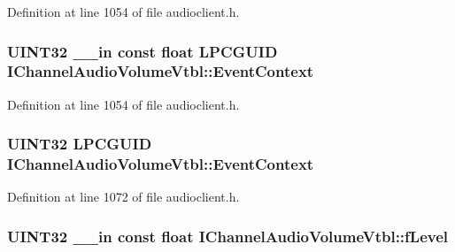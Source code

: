 Definition at line 1054 of file audioclient.\+h.

\subsubsection[{\texorpdfstring{Event\+Context}{EventContext}}]{ U\+I\+N\+T32 {\bf \+\_\+\+\_\+in} {\bf const} float {\bf L\+P\+C\+G\+U\+ID} I\+Channel\+Audio\+Volume\+Vtbl\+::\+Event\+Context}\hypertarget{struct_i_channel_audio_volume_vtbl_a0647d9cc251cffc408440c82883078fe}{}\label{struct_i_channel_audio_volume_vtbl_a0647d9cc251cffc408440c82883078fe}


Definition at line 1054 of file audioclient.\+h.

\subsubsection[{\texorpdfstring{Event\+Context}{EventContext}}]{ U\+I\+N\+T32 {\bf L\+P\+C\+G\+U\+ID} I\+Channel\+Audio\+Volume\+Vtbl\+::\+Event\+Context}\hypertarget{struct_i_channel_audio_volume_vtbl_af68dc0265aea3b154720692dee18934f}{}\label{struct_i_channel_audio_volume_vtbl_af68dc0265aea3b154720692dee18934f}


Definition at line 1072 of file audioclient.\+h.

\subsubsection[{\texorpdfstring{f\+Level}{fLevel}}]{ U\+I\+N\+T32 {\bf \+\_\+\+\_\+in} {\bf const} float I\+Channel\+Audio\+Volume\+Vtbl\+::f\+Level}\hypertarget{struct_i_channel_audio_volume_vtbl_a7199b2fb0f1bbeceb2dfd964fcd3f081}{}\label{struct_i_channel_audio_volume_vtbl_a7199b2fb0f1bbeceb2dfd964fcd3f081}


